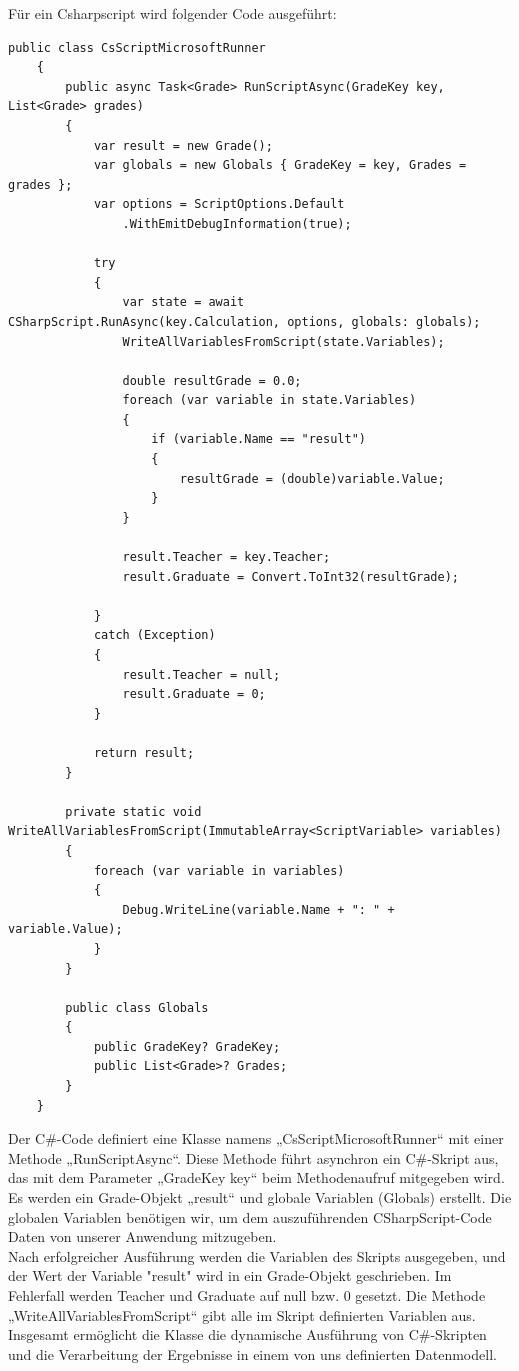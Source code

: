 Für ein Csharpscript wird folgender Code ausgeführt:

\begin{lstlisting}[language={[Sharp]C},caption=Code for CsharpScripting,label=lst:impl:csc]
    public class CsScriptMicrosoftRunner
    {
        public async Task<Grade> RunScriptAsync(GradeKey key, List<Grade> grades)
        {
            var result = new Grade();
            var globals = new Globals { GradeKey = key, Grades = grades };
            var options = ScriptOptions.Default
                .WithEmitDebugInformation(true);

            try
            {
                var state = await CSharpScript.RunAsync(key.Calculation, options, globals: globals);
                WriteAllVariablesFromScript(state.Variables);

                double resultGrade = 0.0;
                foreach (var variable in state.Variables)
                {
                    if (variable.Name == "result")
                    {
                        resultGrade = (double)variable.Value;
                    }
                }

                result.Teacher = key.Teacher;
                result.Graduate = Convert.ToInt32(resultGrade);

            }
            catch (Exception)
            {
                result.Teacher = null;
                result.Graduate = 0;
            }

            return result;
        }

        private static void WriteAllVariablesFromScript(ImmutableArray<ScriptVariable> variables)
        {
            foreach (var variable in variables)
            {
                Debug.WriteLine(variable.Name + ": " + variable.Value);
            }
        }

        public class Globals
        {
            public GradeKey? GradeKey;
            public List<Grade>? Grades;
        }
    }
\end{lstlisting}

Der C\#-Code definiert eine Klasse namens „CsScriptMicrosoftRunner“ mit einer Methode „RunScriptAsync“. 
Diese Methode führt asynchron ein C\#-Skript aus, das mit dem Parameter „GradeKey key“ beim Methodenaufruf 
mitgegeben wird. 
\\
Es werden ein Grade-Objekt „result“ und globale Variablen (Globals) erstellt. Die globalen Variablen 
benötigen wir, um dem auszuführenden CSharpScript-Code Daten von unserer Anwendung mitzugeben. 
\\
Nach erfolgreicher Ausführung werden die Variablen des Skripts ausgegeben, und der Wert der Variable 
"result" wird in ein Grade-Objekt geschrieben. Im Fehlerfall werden Teacher und Graduate auf null bzw. 0 
gesetzt. Die Methode „WriteAllVariablesFromScript“ gibt alle im Skript definierten Variablen aus. 
\\
Insgesamt ermöglicht die Klasse die dynamische Ausführung von C\#-Skripten und die Verarbeitung der 
Ergebnisse in einem von uns definierten Datenmodell.


